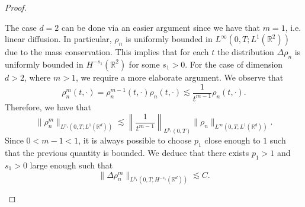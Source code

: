\documentclass[11pt,a4paper]{article}
\numberwithin{equation}{section}
\newcommand{\R}{{\mathbb{R}}}
\theoremstyle{plain}
\theoremstyle{remark}
\newcommand {\f}{\frac}
\begin{document}
\begin{proof}
\begin{enumeratesteps}
The case $d=2$ can be done via an easier argument since we have that $m=1$, i.e. linear diffusion. In particular, $\rho_n$ is uniformly bounded in $L^{\infty}(0,T; L^1(\R^2))$ due to the mass conservation. This implies that for each $t$ the distribution $\Delta\rho_n$ is uniformly bounded in $H^{-s_1}(\R^2)$ for some $s_1>0$. For the case  of dimension $d>2$, where $m>1$, we require a more elaborate argument. We observe that 
$$
    \rho_n^{m}(t,\cdot)=\rho_n^{m-1}(t,\cdot)\rho_n (t,\cdot)\lesssim \f{1}{t^{m-1}}\rho_{n}(t,\cdot).
$$
Therefore, we have that
$$
    \|\rho_n^m\|_{L^{p_1}(0,T; L^{1}(\R^d))}\lesssim \left\|\f{1}{t^{m-1}}\right\|_{L^{p_1}(0,T)}\|\rho_{n}\|_{L^{\infty}(0,T; L^{1}(\R^d))}.
$$
Since $0<m-1<1$, it is always possible to choose $p_1$ close enough to $1$ such that the previous quantity is bounded. We deduce that there exists $p_1>1$ and $s_1>0$ large enough such that
$$
\|\Delta \rho_n^m\|_{L^{p_1}(0,T; H^{-s_1}(\R^d))}\lesssim C.
$$


\end{enumeratesteps}
\end{proof}
\end{document}
